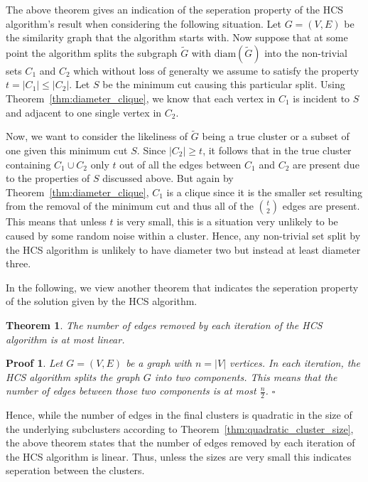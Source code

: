 \documentclass[paper=a4,fontsize=11pt,DIV=8,BCOR=5mm,twoside,pdftex,bibtotocnumbered]{scrreprt}
\newcommand{\diam}{\text{diam}}
\theoremstyle{plain}
\newtheorem{thm}{Theorem}
\newtheorem*{myproof}{Proof}
\newenvironment{pf}{\begin{myproof}}{\hfill$\square$\end{myproof}}
\begin{document}
The above theorem gives an indication of the seperation property of the HCS algorithm's result when considering the following situation. Let $G=(V,E)$ be the similarity graph that the algorithm starts with. Now suppose that at some point the algorithm splits the subgraph $\tilde{G}$ with $\diam(\tilde{G})$ into the non-trivial sets $C_1$ and $C_2$ which without loss of generalty we assume to satisfy the property $t = |C_1| \le |C_2|$. Let $S$ be the minimum cut causing this particular split. Using Theorem~\ref{thm:diameter_clique}, we know that each vertex in $C_1$ is incident to $S$ and adjacent to one single vertex in $C_2$. 

Now, we want to consider the likeliness of $\tilde{G}$ being a true cluster or a subset of one given this minimum cut $S$. Since $|C_2| \ge t$, it follows that in the true cluster containing $C_1 \cup C_2$ only $t$ out of all the edges between $C_1$ and $C_2$ are present due to the properties of $S$ discussed above. But again by Theorem~\ref{thm:diameter_clique}, $C_1$ is a clique since it is the smaller set resulting from the removal of the minimum cut and thus all of the $t \choose 2$ edges are present. This means that unless $t$ is very small, this is a situation very unlikely to be caused by some random noise within a cluster. Hence, any non-trivial set split by the HCS algorithm is unlikely to have diameter two but instead at least diameter three.

In the following, we view another theorem that indicates the seperation property of the solution given by the HCS algorithm.

\begin{thm}
	The number of edges removed by each iteration of the HCS algorithm is at most linear.
\end{thm}

\begin{pf}
	Let $G=(V,E)$ be a graph with $n=|V|$ vertices. In each iteration, the HCS algorithm splits the graph $G$ into two components. This means that the number of edges between those two components is at most $\frac{n}{2}$.
\end{pf}

Hence, while the number of edges in the final clusters is quadratic in the size of the underlying subclusters according to Theorem~\ref{thm:quadratic_cluster_size}, the above theorem states that the number of edges removed by each iteration of the HCS algorithm is linear. Thus, unless the sizes are very small this indicates seperation between the clusters.
\end{document}
